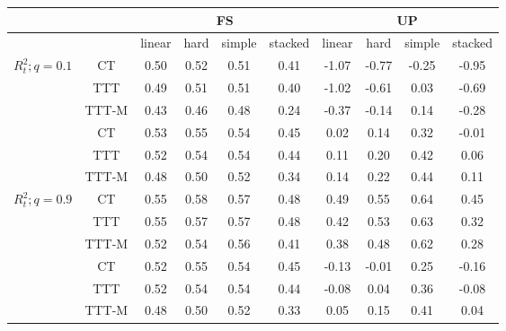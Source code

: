 \begin{table}[!htbp] \centering
\begin{tabular}{|c|c||c|c|c|c||c|c|c|c|}
\hline
    &  & \multicolumn{4}{|c||}{FS} &  \multicolumn{4}{|c|}{UP} \\
\hline
  &   & linear & hard & simple & stacked & linear & hard & simple & stacked \\
\hline
\hline
\multirow{4}{6em}{$R^2_{t}; q=0.1$}      &    CT &   0.50 &    0.52 &      0.51 &       0.41 &  -1.07 &   -0.77 &     -0.25 &      -0.95  \\
      &   TTT &   0.49 &    0.51 &      0.51 &       0.40 &  -1.02 &   -0.61 &      0.03 &      -0.69  \\
      & TTT-M &   0.43 &    0.46 &      0.48 &       0.24 &  -0.37 &   -0.14 &      0.14 &      -0.28  \\
\hline
\hline
\multirow{4}{6em}{$R^2_{t}; q=0.5$}      &    CT &   0.53 &    0.55 &      0.54 &       0.45 &   0.02 &    0.14 &      0.32 &      -0.01  \\
      &   TTT &   0.52 &    0.54 &      0.54 &       0.44 &   0.11 &    0.20 &      0.42 &       0.06  \\
      & TTT-M &   0.48 &    0.50 &      0.52 &       0.34 &   0.14 &    0.22 &      0.44 &       0.11  \\
\hline
\hline
\multirow{4}{6em}{$R^2_{t}; q=0.9$}      &    CT &   0.55 &    0.58 &      0.57 &       0.48 &   0.49 &    0.55 &      0.64 &       0.45  \\
      &   TTT &   0.55 &    0.57 &      0.57 &       0.48 &   0.42 &    0.53 &      0.63 &       0.32  \\
      & TTT-M &   0.52 &    0.54 &      0.56 &       0.41 &   0.38 &    0.48 &      0.62 &       0.28  \\
\hline
\hline
\multirow{4}{6em}{$R^2_{t}$; mean}     &    CT &   0.52 &    0.55 &      0.54 &       0.45 &  -0.13 &   -0.01 &      0.25 &      -0.16  \\
     &   TTT &   0.52 &    0.54 &      0.54 &       0.44 &  -0.08 &    0.04 &      0.36 &      -0.08  \\
     & TTT-M &   0.48 &    0.50 &      0.52 &       0.33 &   0.05 &    0.15 &      0.41 &       0.04  \\
\hline
\end{tabular}
\end{table}